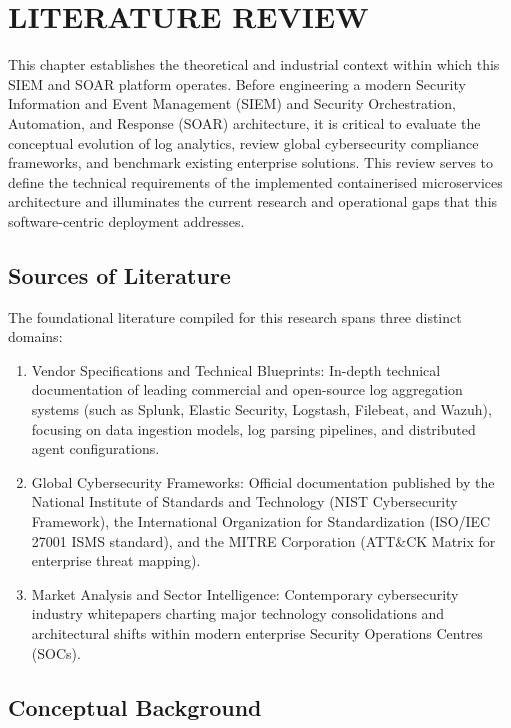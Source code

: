 \newpage
\chapter{LITERATURE REVIEW}

This chapter establishes the theoretical and industrial context within which this SIEM and SOAR platform operates. Before engineering a modern Security Information and Event Management (SIEM) and Security Orchestration, Automation, and Response (SOAR) architecture, it is critical to evaluate the conceptual evolution of log analytics, review global cybersecurity compliance frameworks, and benchmark existing enterprise solutions. This review serves to define the technical requirements of the implemented containerised microservices architecture and illuminates the current research and operational gaps that this software-centric deployment addresses.

\section{Sources of Literature}

The foundational literature compiled for this research spans three distinct domains:

\begin{enumerate}
  \item Vendor Specifications and Technical Blueprints: In-depth technical documentation of leading commercial and open-source log aggregation systems (such as Splunk, Elastic Security, Logstash, Filebeat, and Wazuh), focusing on data ingestion models, log parsing pipelines, and distributed agent configurations.
  \item Global Cybersecurity Frameworks: Official documentation published by the National Institute of Standards and Technology (NIST Cybersecurity Framework), the International Organization for Standardization (ISO/IEC 27001 ISMS standard), and the MITRE Corporation (ATT\&CK Matrix for enterprise threat mapping).
  \item Market Analysis and Sector Intelligence: Contemporary cybersecurity industry whitepapers charting major technology consolidations and architectural shifts within modern enterprise Security Operations Centres (SOCs).
\end{enumerate}

\section{Conceptual Background}

